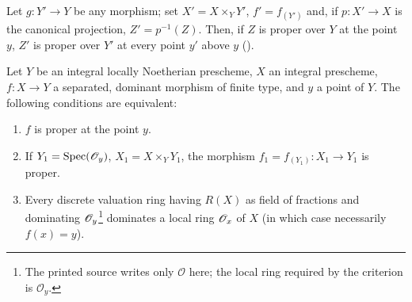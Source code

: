 Let $g:Y'\to Y$ be any morphism; set $X'=X\times_Y Y'$, $f'=f_{(Y')}$ and, if $p:X'\to X$ is the canonical projection, $Z'=p^{-1}(Z)$.
Then, if $Z$ is proper over $Y$ at the point $y$, $Z'$ is proper over $Y'$ at every point $y'$ above $y$ ().

\begin{proposition}[15.7.2]
\label{IV.15.7.2}
Let $Y$ be an integral locally Noetherian prescheme, $X$ an integral prescheme, $f:X\to Y$ a separated, dominant morphism of finite type, and $y$ a point of $Y$.
The following conditions are equivalent:
\begin{enumerate}[label=\emph{\alph*)}]
  \item $f$ is proper at the point $y$.
  \item If $Y_1=\operatorname{Spec}(\mathscr{O}_y)$, $X_1=X\times_Y Y_1$, the morphism $f_1=f_{(Y_1)}:X_1\to Y_1$ is proper.
  \item Every discrete valuation ring having $R(X)$ as field of fractions and dominating $\mathscr{O}_y$\footnote{The printed source writes only $\mathcal O$ here; the local ring required by the criterion is $\mathcal O_y$.} dominates a local ring $\mathscr{O}_x$ of $X$ (in which case necessarily $f(x)=y$).
\end{enumerate}
\end{proposition}

